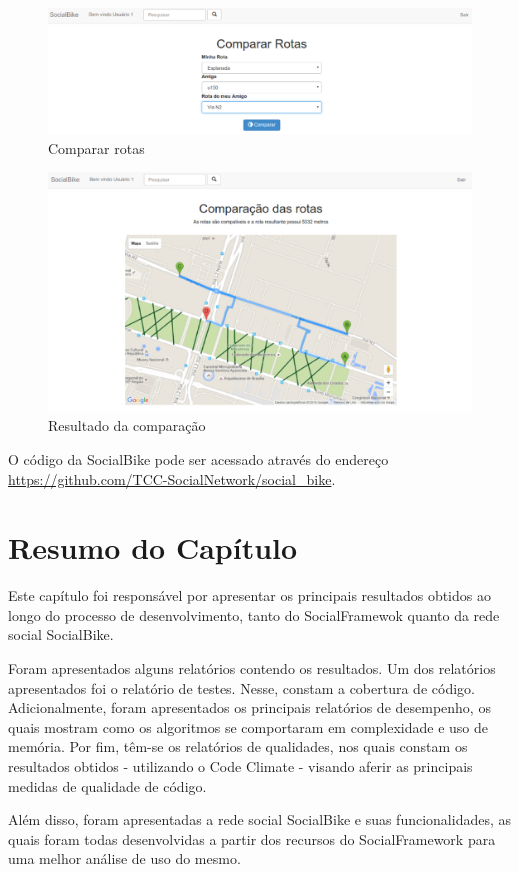 \begin{figure}[!h]
	\centering
	\includegraphics[scale=0.45]{figuras/resultados/comparar_rotas.eps}
	\caption[Comparar rotas]{Comparar rotas}
	\label{comparar_rotas}
\end{figure}

\newpage
\begin{figure}[!h]
	\centering
	\includegraphics[scale=0.45]{figuras/resultados/resultado_comparacao.eps}
	\caption[Resultado da comparação]{Resultado da comparação}
	\label{resultado_comparacao}
\end{figure}

O código da SocialBike pode ser acessado através do endereço \url{https://github.com/TCC-SocialNetwork/social_bike}.

\section{Resumo do Capítulo}
Este capítulo foi responsável por apresentar os principais resultados obtidos ao longo do processo de desenvolvimento, tanto do SocialFramewok quanto da rede social SocialBike.

Foram apresentados alguns relatórios contendo os resultados. Um dos relatórios apresentados foi o relatório de testes. Nesse, constam a cobertura de código. Adicionalmente, foram apresentados os principais relatórios de desempenho, os quais mostram como os algoritmos se comportaram em complexidade e uso de memória. Por fim, têm-se os relatórios de qualidades, nos quais constam os resultados obtidos - utilizando o Code Climate - visando aferir as principais medidas de qualidade de código.

Além disso, foram apresentadas a rede social SocialBike e suas funcionalidades, as quais foram todas desenvolvidas a partir dos recursos do SocialFramework para uma melhor análise de uso do mesmo.
